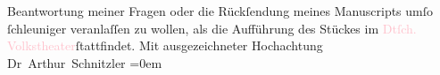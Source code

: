                Beantwortung meiner Fragen oder die Rückſendung meines Manuscripts umſo ſchleuniger
               veranlaſſen zu wollen, als die Aufführung des Stückes \label{K_L00282_3v}\label{K_L00282_3h} im
                  \textcolor{pink}{Dtſch. Volkstheater}{}\ledrightnote{\textcolor{pink}{Volkstheater}}{ }ſtattfindet.\pend
           \pstart
           Mit ausgezeichneter Hochachtung{\\[\baselineskip]}\spacefill\mbox{Dr Arthur Schnitzler}\pend
           \leftskip=0em{}\endnumbering{}  
      